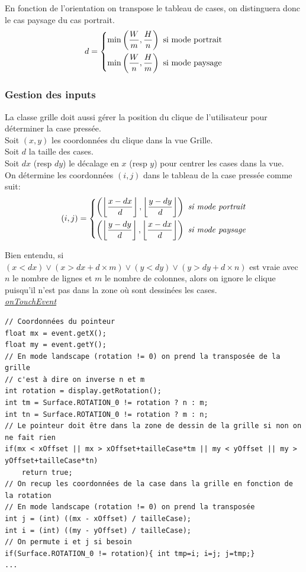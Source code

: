 \documentclass{article}
\newcommand{\Min}[1]{\min\limits_{#1}}
\begin{document}
\noindent En fonction de l'orientation on transpose le tableau de cases, on distinguera donc le cas paysage du cas portrait.\\

$$d=\begin{dcases}
\Min{}\left(\frac{W}{m}, \frac{H}{n}\right) \text{ si mode portrait} \\
\Min{}\left(\frac{W}{n}, \frac{H}{m}\right) \text{ si mode paysage}
\end{dcases}$$

\subsubsection{Gestion des inputs}
La classe grille doit aussi gérer la position du clique de l'utilisateur pour déterminer la case pressée.\\

\noindent Soit $(x,y)$ les coordonnées du clique dans la vue Grille.\\
Soit $d$ la taille des cases.\\
Soit $dx$ (resp $dy$) le décalage en $x$ (resp $y$) pour centrer les cases dans la vue.\\
On détermine les coordonnées $(i,j)$ dans le tableau de la case pressée comme suit:\\

$$ (i,j) = \begin{dcases}
    \left(\left\lfloor\frac{x - dx}{d}\right\rfloor, \left\lfloor\frac{y - dy}{d}\right\rfloor \right) \textit{ si mode portrait}\\
     \left(\left\lfloor\frac{y - dy}{d}\right\rfloor, \left\lfloor\frac{x - dx}{d}\right\rfloor \right) \textit{ si mode paysage}
\end{dcases}$$

Bien entendu, si $(x < dx)\vee (x > dx+d\times m) \vee (y < dy) \vee (y > dy+d\times n)$ est vraie avec $n$ le nombre de lignes et $m$ le nombre de colonnes, alors on ignore le clique puisqu'il n'est pas dans la zone où sont dessinées les cases.\\

\noindent \underline{\textit{onTouchEvent}}

\begin{verbatim}
// Coordonnées du pointeur
float mx = event.getX();
float my = event.getY();
// En mode landscape (rotation != 0) on prend la transposée de la grille
// c'est à dire on inverse n et m
int rotation = display.getRotation();
int tm = Surface.ROTATION_0 != rotation ? n : m;
int tn = Surface.ROTATION_0 != rotation ? m : n;
// Le pointeur doit être dans la zone de dessin de la grille si non on ne fait rien
if(mx < xOffset || mx > xOffset+tailleCase*tm || my < yOffset || my > yOffset+tailleCase*tn)
    return true;
// On recup les coordonnées de la case dans la grille en fonction de la rotation
// En mode landscape (rotation != 0) on prend la transposée
int j = (int) ((mx - xOffset) / tailleCase);
int i = (int) ((my - yOffset) / tailleCase);
// On permute i et j si besoin
if(Surface.ROTATION_0 != rotation){ int tmp=i; i=j; j=tmp;}
...
\end{verbatim}
\end{document}
